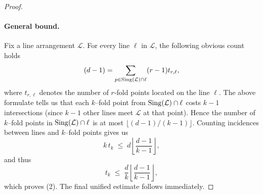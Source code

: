 \documentclass[11pt]{article}
\theoremstyle{plain}
\theoremstyle{definition}
\theoremstyle{remark}
\newcommand{\LL}{\mathcal{L}}
\begin{document}
\begin{proof}
\paragraph{General bound.}
Fix a line arrangement $\LL$. For every line $\ell$ in $\LL$, the following obvious count holds
\[(d-1) = \sum_{p \in {\rm Sing}(\mathcal{L}) \cap \ell} (r-1)t_{r,\ell},\]
where $t_{r,\ell}$ denotes the number of $r$-fold points located on the line $\ell$.
The above formulate tells us that each $k$--fold point from ${\rm Sing}(\mathcal{L}) \cap \ell$ costs $k-1$ intersections (since $k-1$ other lines meet $\LL$ at that point). Hence the number of $k$--fold points in ${\rm Sing}(\mathcal{L}) \cap \ell$ is at most $\lfloor (d-1)/(k-1)\rfloor$.
Counting incidences between lines and $k$--fold points gives us
\[
k\,t_k \;\le\; d\left\lfloor\frac{d-1}{k-1}\right\rfloor,
\]
and thus
\[
t_k \;\le\; \frac{d}{k}\left\lfloor\frac{d-1}{k-1}\right\rfloor,
\]
which proves (2). The final unified estimate follows immediately.
\end{proof}
\end{document}
